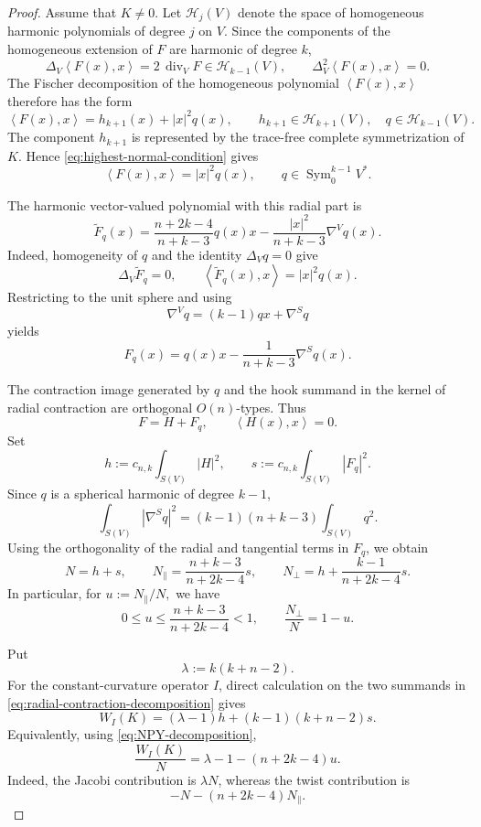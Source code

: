 \documentclass[reqno,11pt]{amsart}
\theoremstyle{definition}
\newcommand{\Sym}{\operatorname{Sym}}
\newcommand{\Harm}{\mathscr H}
\newcommand{\inner}[2]{\left\langle #1,#2\right\rangle}
\begin{document}
\begin{proof}
Assume that $K\neq0$. Let $\Harm_j(V)$ denote the space of homogeneous
harmonic polynomials of degree $j$ on $V$. Since the components of the
homogeneous extension of $F$ are harmonic of degree $k$,
$$
  \Delta_V\inner{F(x)}x
  =2\,\operatorname{div}_V F\in\Harm_{k-1}(V),
  \qquad
  \Delta_V^2\inner{F(x)}x=0.
$$
The Fischer decomposition of the homogeneous polynomial
$\inner{F(x)}x$ therefore has the form
$$
  \inner{F(x)}x=h_{k+1}(x)+|x|^2q(x),
  \qquad
  h_{k+1}\in\Harm_{k+1}(V),
  \quad
  q\in\Harm_{k-1}(V).
$$
The component $h_{k+1}$ is represented by the trace-free complete
symmetrization of $K$. Hence \eqref{eq:highest-normal-condition} gives
$$
  \inner{F(x)}x=|x|^2q(x),
  \qquad
  q\in\Sym^{k-1}_0V^*.
$$

The harmonic vector-valued polynomial with this radial part is
\begin{equation*}
  \widetilde F_q(x)
  =\frac{n+2k-4}{n+k-3}q(x)x
  -\frac{|x|^2}{n+k-3}\nabla^Vq(x).
\end{equation*}
Indeed, homogeneity of $q$ and the identity $\Delta_Vq=0$ give
$$
  \Delta_V\widetilde F_q=0,
  \qquad
  \inner{\widetilde F_q(x)}x=|x|^2q(x).
$$
Restricting to the unit sphere and using
$$
  \nabla^Vq=(k-1)qx+\nabla^Sq
$$
yields
$$
  F_q(x)
  =q(x)x-\frac1{n+k-3}\nabla^Sq(x).
$$

The contraction image generated by $q$ and the hook summand in the kernel
of radial contraction are orthogonal $O(n)$-types. Thus
\begin{equation}\label{eq:radial-contraction-decomposition}
  F=H+F_q,
  \qquad
  \inner{H(x)}x=0.
\end{equation}
Set
$$
  h:=c_{n,k}\int_{S(V)}|H|^2,
  \qquad
  s:=c_{n,k}\int_{S(V)}|F_q|^2.
$$
Since $q$ is a spherical harmonic of degree $k-1$,
$$
  \int_{S(V)}|\nabla^Sq|^2
  =(k-1)(n+k-3)\int_{S(V)}q^2.
$$
Using the orthogonality of the radial and tangential terms in $F_q$,
we obtain
\begin{equation}\label{eq:NPY-decomposition}
  N=h+s,
  \qquad
  N_{\parallel}
  =\frac{n+k-3}{n+2k-4}s,
  \qquad
  N_{\perp}
  =h+\frac{k-1}{n+2k-4}s.
\end{equation}
In particular, for
$
  u:={N_{\parallel}} / {N},
$
we have
\begin{equation*}
  0\leq u\leq\frac{n+k-3}{n+2k-4}<1,
  \qquad
  \frac{N_{\perp}}N=1-u.
\end{equation*}

Put
$$
  \lambda:=k(k+n-2).
$$
For the constant-curvature operator $I$, direct calculation on the two
summands in \eqref{eq:radial-contraction-decomposition} gives
\begin{equation*}
  W_I(K)
  =(\lambda-1)h+(k-1)(k+n-2)s.
\end{equation*}
Equivalently, using \eqref{eq:NPY-decomposition},
\begin{equation}\label{eq:WI-u}
  \frac{W_I(K)}N
  =\lambda-1-(n+2k-4)u.
\end{equation}
Indeed, the Jacobi contribution is $\lambda N$, whereas the twist
contribution is
$$
  -N-(n+2k-4)N_{\parallel}.
$$


\end{proof}
\end{document}
